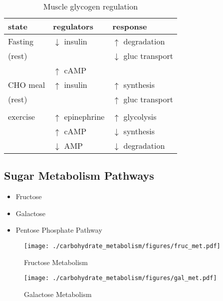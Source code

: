 \documentclass{scrartcl}
\begin{document}
\begin{table}[htbp]
\caption{\label{tab:org784da6d}
Muscle glycogen regulation}
\centering
\begin{tabular}{lll}
state & regulators & response\\
\hline
Fasting & \(\downarrow\) insulin & \(\uparrow\) degradation\\
(rest) &  & \(\downarrow\) gluc transport\\
 & \(\uparrow\) cAMP & \\
CHO meal & \(\uparrow\) insulin & \(\uparrow\) synthesis\\
(rest) &  & \(\uparrow\) gluc transport\\
 &  & \\
exercise & \(\uparrow\) epinephrine & \(\uparrow\) glycolysis\\
 & \(\uparrow\) cAMP & \(\downarrow\) synthesis\\
 & \(\downarrow\) AMP & \(\downarrow\) degradation\\
\end{tabular}
\end{table}

\subsection{Sugar Metabolism Pathways}
\label{sec:org0fe7fcc}
\begin{itemize}
\item Fructose
\item Galactose
\item Pentose Phosphate Pathway
\end{itemize}

\begin{figure}[htbp]
\centering
\texttt{[image: ./carbohydrate\_metabolism/figures/fruc\_met.pdf]}
\caption{\label{fig:orgddf6ce6}
Fructose Metabolism}
\end{figure}

\begin{figure}[htbp]
\centering
\texttt{[image: ./carbohydrate\_metabolism/figures/gal\_met.pdf]}
\caption{\label{fig:orgbcbefa5}
Galactose Metabolism}
\end{figure}
\end{document}
